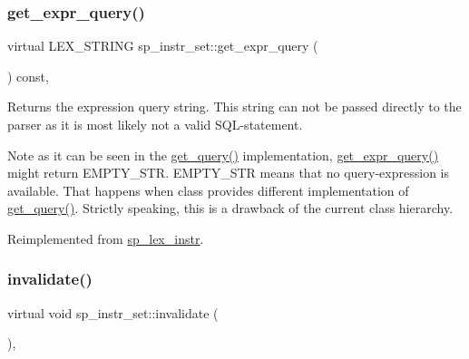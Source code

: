 \mbox{\label{classsp__instr__set_a13de9a0560941323d3cc7c9918e00036}} 
\subsubsection{\texorpdfstring{get\+\_\+expr\+\_\+query()}{get\_expr\_query()}}
{\footnotesize\ttfamily virtual L\+E\+X\+\_\+\+S\+T\+R\+I\+NG sp\+\_\+instr\+\_\+set\+::get\+\_\+expr\+\_\+query (\begin{DoxyParamCaption}{ }\end{DoxyParamCaption}) const\hspace{0.3cm}{\ttfamily [inline]}, {\ttfamily [virtual]}}

\begin{DoxyReturn}{Returns}
the expression query string. This string can not be passed directly to the parser as it is most likely not a valid S\+QL-\/statement.
\end{DoxyReturn}
\begin{DoxyNote}{Note}
as it can be seen in the \mbox{\hyperlink{classsp__lex__instr_a8bbcccae8739634565f8be2134171b03}{get\+\_\+query()}} implementation, \mbox{\hyperlink{classsp__instr__set_a13de9a0560941323d3cc7c9918e00036}{get\+\_\+expr\+\_\+query()}} might return E\+M\+P\+T\+Y\+\_\+\+S\+TR. E\+M\+P\+T\+Y\+\_\+\+S\+TR means that no query-\/expression is available. That happens when class provides different implementation of \mbox{\hyperlink{classsp__lex__instr_a8bbcccae8739634565f8be2134171b03}{get\+\_\+query()}}. Strictly speaking, this is a drawback of the current class hierarchy. 
\end{DoxyNote}


Reimplemented from \mbox{\hyperlink{classsp__lex__instr_ad355d3ed08ae1fef4811fe6838ed78e2}{sp\+\_\+lex\+\_\+instr}}.

\mbox{\label{classsp__instr__set_a4c871b1b9db55d27231d512a8eef9285}} 
\subsubsection{\texorpdfstring{invalidate()}{invalidate()}}
{\footnotesize\ttfamily virtual void sp\+\_\+instr\+\_\+set\+::invalidate (\begin{DoxyParamCaption}{ }\end{DoxyParamCaption})\hspace{0.3cm}{\ttfamily [inline]}, {\ttfamily [virtual]}}

